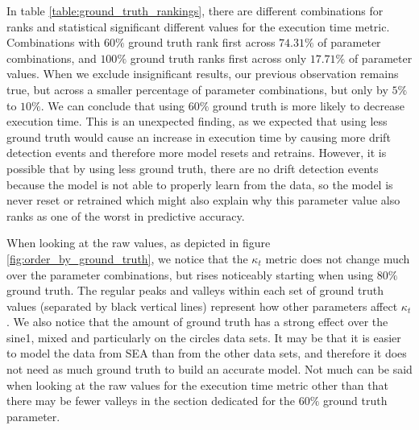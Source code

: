 In table \ref{table:ground_truth_rankings}, there are different combinations for ranks and statistical significant different values for the execution time metric. Combinations with $60\%$ ground truth rank first across $74.31\%$ of parameter combinations, and $100\%$ ground truth ranks first across only $17.71\%$ of parameter values. When we exclude insignificant results, our previous observation remains true, but across a smaller percentage of parameter combinations, but only by $5\%$ to $10\%$. We can conclude that using $60\%$ ground truth is more likely to decrease execution time. This is an unexpected finding, as we expected that using less ground truth would cause an increase in execution time by causing more drift detection events and therefore more model resets and retrains. However, it is possible that by using less ground truth, there are no drift detection events because the model is not able to properly learn from the data, so the model is never reset or retrained which might also explain why this parameter value also ranks as one of the worst in predictive accuracy.

When looking at the raw values, as depicted in figure \ref{fig:order_by_ground_truth}, we notice that the $\kappa_t$ metric does not change much over the parameter combinations, but rises noticeably starting when using $80\%$ ground truth. The regular peaks and valleys within each set of ground truth values (separated by black vertical lines) represent how other parameters affect $\kappa_t$. We also notice that the amount of ground truth has a strong effect over the sine1, mixed and particularly on the circles data sets. It may be that it is easier to model the data from SEA than from the other data sets, and therefore it does not need as much ground truth to build an accurate model. Not much can be said when looking at the raw values for the execution time metric other than that there may be fewer valleys in the section dedicated for the $60\%$ ground truth parameter.

